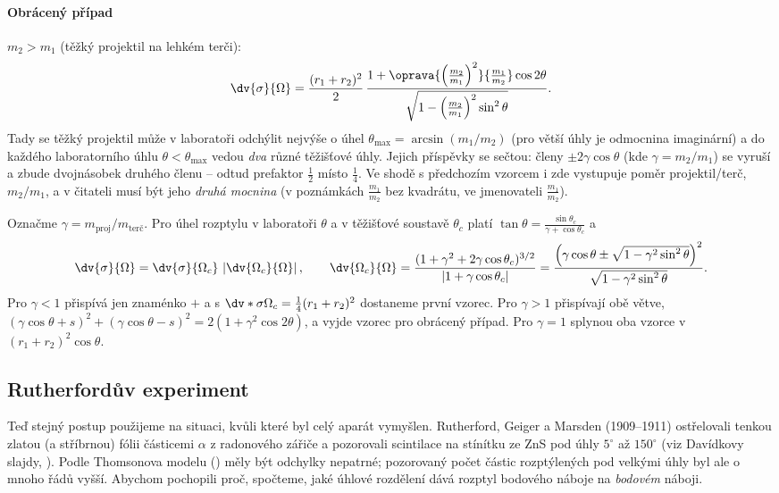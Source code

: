 \paragraph{Obrácený případ} $m_2 > m_1$ (těžký projektil na lehkém terči):
\begin{equation}
  \dv{\sigma}{\Omega} = \frac{(r_1+r_2)^2}{2}\,
  \frac{1+\oprava{\left(\frac{m_2}{m_1}\right)^2}{\frac{m_1}{m_2}}\cos 2\theta}{\sqrt{1-\left(\frac{m_2}{m_1}\right)^2\sin^2\theta}} .
\end{equation}
Tady se těžký projektil může v laboratoři odchýlit nejvýše o úhel $\theta_{\max} = \arcsin(m_1/m_2)$ (pro větší úhly je odmocnina imaginární) a do každého laboratorního úhlu $\theta<\theta_{\max}$ vedou \emph{dva} různé těžišťové úhly. Jejich příspěvky se sečtou: členy $\pm 2\gamma\cos\theta$ (kde $\gamma = m_2/m_1$) se vyruší a zbude dvojnásobek druhého členu -- odtud prefaktor $\frac12$ místo $\frac14$. Ve shodě s předchozím vzorcem i zde vystupuje poměr projektil/terč, $m_2/m_1$, a v čitateli musí být jeho \emph{druhá mocnina} (v poznámkách $\frac{m_1}{m_2}$ bez kvadrátu, ve jmenovateli $\frac{m_1}{m_2}$).

\begin{vysvetleni}
Označme $\gamma = m_{\text{proj}}/m_{\text{terč}}$. Pro úhel rozptylu v laboratoři $\theta$ a v těžišťové soustavě $\theta_c$ platí $\tan\theta = \frac{\sin\theta_c}{\gamma + \cos\theta_c}$ a
\[
  \dv{\sigma}{\Omega} = \dv{\sigma}{\Omega_c}\,\left|\dv{\Omega_c}{\Omega}\right|,
  \qquad
  \dv{\Omega_c}{\Omega} = \frac{(1+\gamma^2+2\gamma\cos\theta_c)^{3/2}}{|1+\gamma\cos\theta_c|}
  = \frac{\left(\gamma\cos\theta \pm \sqrt{1-\gamma^2\sin^2\theta}\right)^2}{\sqrt{1-\gamma^2\sin^2\theta}} .
\]
Pro $\gamma<1$ přispívá jen znaménko $+$ a s $\dv*{\sigma}{\Omega_c} = \frac14(r_1+r_2)^2$ dostaneme první vzorec. Pro $\gamma>1$ přispívají obě větve, $(\gamma\cos\theta+s)^2 + (\gamma\cos\theta-s)^2 = 2(1+\gamma^2\cos2\theta)$, a vyjde vzorec pro obrácený případ. Pro $\gamma=1$ splynou oba vzorce v $(r_1+r_2)^2\cos\theta$.
\end{vysvetleni}

\subsection{Rutherfordův experiment}

Teď stejný postup použijeme na situaci, kvůli které byl celý aparát vymyšlen. Rutherford, Geiger a Marsden (1909--1911) ostřelovali tenkou zlatou (a stříbrnou) fólii částicemi $\alpha$ z radonového zářiče a pozorovali scintilace na stínítku ze ZnS pod úhly $5^\circ$ až $150^\circ$ (viz Davídkovy slajdy, ). Podle Thomsonova modelu () měly být odchylky nepatrné; pozorovaný počet částic rozptýlených pod velkými úhly byl ale o mnoho řádů vyšší. Abychom pochopili proč, spočteme, jaké úhlové rozdělení dává rozptyl bodového náboje na \emph{bodovém} náboji.

